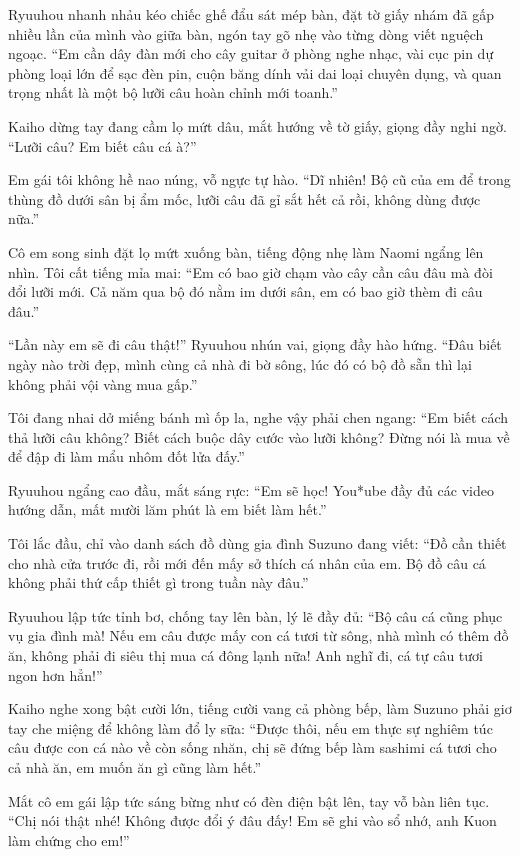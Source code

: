 ﻿\documentclass[../main.tex]{subfiles}
\begin{document}
Ryuuhou nhanh nhảu kéo chiếc ghế đẩu sát mép bàn, đặt tờ giấy nhám đã gấp nhiều lần của mình vào giữa bàn, ngón tay gõ nhẹ vào từng dòng viết nguệch ngoạc. ``Em cần dây đàn mới cho cây guitar ở phòng nghe nhạc, vài cục pin dự phòng loại lớn để sạc đèn pin, cuộn băng dính vải dai loại chuyên dụng, và quan trọng nhất là một bộ lưỡi câu hoàn chỉnh mới toanh.''

Kaiho dừng tay đang cầm lọ mứt dâu, mắt hướng về tờ giấy, giọng đầy nghi ngờ. ``Lưỡi câu? Em biết câu cá à?''

Em gái tôi không hề nao núng, vỗ ngực tự hào. ``Dĩ nhiên! Bộ cũ của em để trong thùng đồ dưới sân bị ẩm mốc, lưỡi câu đã gỉ sắt hết cả rồi, không dùng được nữa.''

Cô em song sinh đặt lọ mứt xuống bàn, tiếng động nhẹ làm Naomi ngẩng lên nhìn. Tôi cất tiếng mỉa mai: ``Em có bao giờ chạm vào cây cần câu đâu mà đòi đổi lưỡi mới. Cả năm qua bộ đó nằm im dưới sân, em có bao giờ thèm đi câu đâu.''

``Lần này em sẽ đi câu thật!'' Ryuuhou nhún vai, giọng đầy hào hứng. ``Đâu biết ngày nào trời đẹp, mình cùng cả nhà đi bờ sông, lúc đó có bộ đồ sẵn thì lại không phải vội vàng mua gấp.''

Tôi đang nhai dở miếng bánh mì ốp la, nghe vậy phải chen ngang: ``Em biết cách thả lưỡi câu không? Biết cách buộc dây cước vào lưỡi không? Đừng nói là mua về để đập đi làm mẩu nhôm đốt lửa đấy.''

Ryuuhou ngẩng cao đầu, mắt sáng rực: ``Em sẽ học! You*ube đầy đủ các video hướng dẫn, mất mười lăm phút là em biết làm hết.''

Tôi lắc đầu, chỉ vào danh sách đồ dùng gia đình Suzuno đang viết: ``Đồ cần thiết cho nhà cửa trước đi, rồi mới đến mấy sở thích cá nhân của em. Bộ đồ câu cá không phải thứ cấp thiết gì trong tuần này đâu.''

Ryuuhou lập tức tỉnh bơ, chống tay lên bàn, lý lẽ đầy đủ: ``Bộ câu cá cũng phục vụ gia đình mà! Nếu em câu được mấy con cá tươi từ sông, nhà mình có thêm đồ ăn, không phải đi siêu thị mua cá đông lạnh nữa! Anh nghĩ đi, cá tự câu tươi ngon hơn hẳn!''

Kaiho nghe xong bật cười lớn, tiếng cười vang cả phòng bếp, làm Suzuno phải giơ tay che miệng để không làm đổ ly sữa: ``Được thôi, nếu em thực sự nghiêm túc câu được con cá nào về còn sống nhăn, chị sẽ đứng bếp làm sashimi cá tươi cho cả nhà ăn, em muốn ăn gì cũng làm hết.''

Mắt cô em gái lập tức sáng bừng như có đèn điện bật lên, tay vỗ bàn liên tục. ``Chị nói thật nhé! Không được đổi ý đâu đấy! Em sẽ ghi vào sổ nhớ, anh Kuon làm chứng cho em!''
\end{document}
